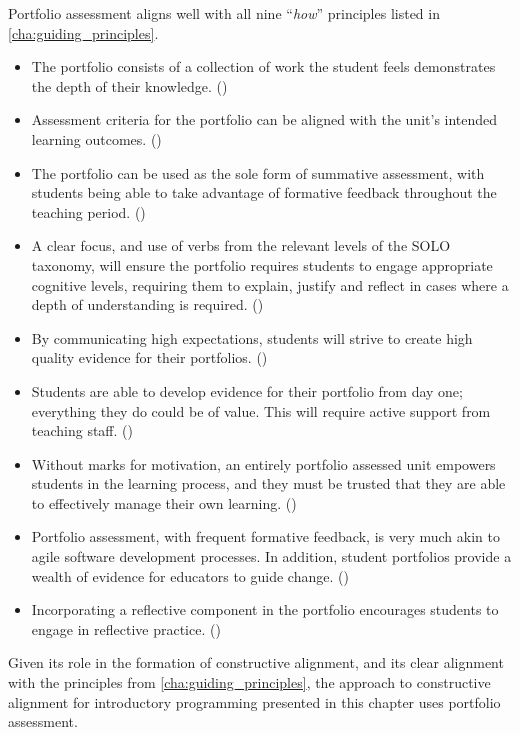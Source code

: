 %
%
\clearpage
Portfolio assessment aligns well with all nine ``\emph{how}'' principles listed in \cref{cha:guiding_principles}. 
\begin{itemize}[noitemsep,nolistsep]
	\item The portfolio consists of a collection of work the student feels demonstrates the depth of their knowledge. ()
	\item Assessment criteria for the portfolio can be aligned with the unit's intended learning outcomes. ()
	\item The portfolio can be used as the sole form of summative assessment, with students being able to take advantage of formative feedback throughout the teaching period. ()
	\item A clear focus, and use of verbs from the relevant levels of the SOLO taxonomy, will ensure the portfolio requires students to engage appropriate cognitive levels, requiring them to explain, justify and reflect in cases where a depth of understanding is required. ()
	\item By communicating high expectations, students will strive to create high quality evidence for their portfolios. ()
	\item Students are able to develop evidence for their portfolio from day one; everything they do could be of value. This will require active support from teaching staff. ()
	\item Without marks for motivation, an entirely portfolio assessed unit empowers students in the learning process, and they must be trusted that they are able to effectively manage their own learning. ()
	\item Portfolio assessment, with frequent formative feedback, is very much akin to agile software development processes. In addition, student portfolios provide a wealth of evidence for educators to guide change. ()
	\item Incorporating a reflective component in the portfolio encourages students to engage in reflective practice. ()
\end{itemize}

Given its role in the formation of constructive alignment, and its clear alignment with the principles from \cref{cha:guiding_principles}, the approach to constructive alignment for introductory programming presented in this chapter uses portfolio assessment.


